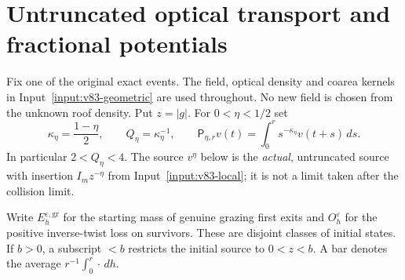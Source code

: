 \section{Untruncated optical transport and fractional potentials}
\label{sec:v83-potential}
Fix one of the original exact events. The field, optical density and
coarea kernels in Input~\ref{input:v83-geometric} are used throughout.
No new field is chosen from the unknown roof density. Put $z=|g|$.
For $0<\eta<1/2$ set
\begin{equation}\label{eq:v83-potential-parameters}
 \kappa_\eta=\frac{1-\eta}{2},\qquad Q_\eta=\kappa_\eta^{-1},\qquad
 \mathsf P_{\eta,r}v(t)=\int_0^r s^{-\kappa_\eta}v(t+s)\,ds.
\end{equation}
In particular $2<Q_\eta<4$. The source $v^\eta$ below is the
\emph{actual}, untruncated source with insertion $I_m z^{-\eta}$
from Input~\ref{input:v83-local}; it is not a limit taken after the
collision limit.

Write $E_h^{\varepsilon,\mathrm{gr}}$ for the starting mass of genuine
grazing first exits and $O_h^\varepsilon$ for the positive inverse-twist
loss on survivors. These are disjoint classes of initial states. If
$b>0$, a subscript $<b$ restricts the initial source to $0<z<b$.
A bar denotes the average $r^{-1}\int_0^r\cdot\,dh$.

